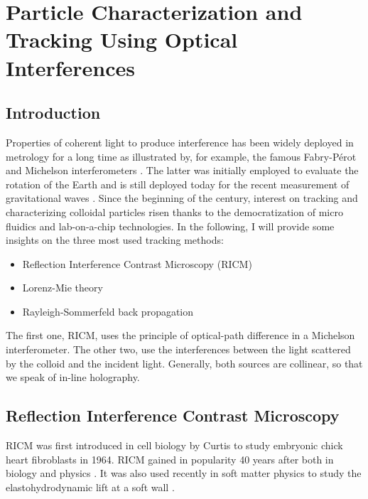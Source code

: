 \section{Particle Characterization and Tracking Using Optical Interferences}
\label{sec:chapter2}

\subsection{Introduction}

Properties of coherent light to produce interference has been widely deployed in metrology for a long time as illustrated by, for example, the famous Fabry-Pérot  \cite{fabry_theorie_1899, perot_application_1899} and Michelson interferometers \cite{michelson_relative_1887}. The latter was initially employed to evaluate the rotation of the Earth and is still deployed today for the recent measurement of gravitational waves
\cite{ligo_scientific_collaboration_and_virgo_collaboration_gw151226_2016}. 
Since the beginning of the century, interest on tracking and characterizing colloidal particles risen thanks to the democratization of micro fluidics and lab-on-a-chip technologies. In the following, I will provide some insights on the three most used tracking methods:

\begin{itemize}
	\item Reflection Interference Contrast Microscopy (\gls{RICM})
	\item Lorenz-Mie theory
	\item Rayleigh-Sommerfeld back propagation
\end{itemize}

The first one, \gls{RICM}, uses the principle of optical-path difference in a Michelson interferometer. The other two, use the interferences between the light scattered by the colloid and the incident light. Generally, both sources are collinear, so that we speak of in-line holography. 



\subsection{Reflection Interference Contrast Microscopy}




\gls{RICM} was first introduced in cell biology by Curtis to study embryonic chick heart fibroblasts \cite{curtis_mechanism_1964} in 1964. \gls{RICM} gained in popularity 40 years after both in biology and physics \cite{filler_reflection_2000, siver_use_2000, weber_2_2003, limozin_quantitative_2009, nadal_probing_2002, raedler_measurement_1992}. It was also used recently in soft matter physics to study the elastohydrodynamic lift at a soft wall \cite{davies_elastohydrodynamic_2018}.

